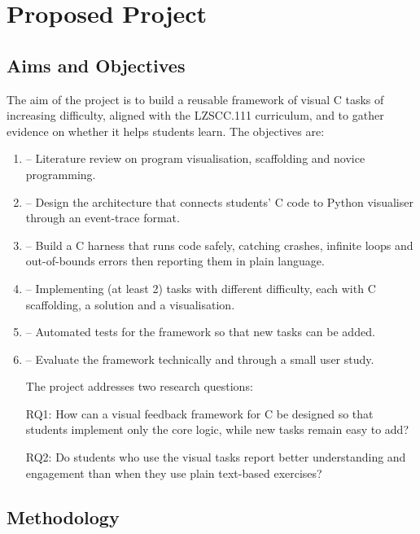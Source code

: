 \documentclass[11pt,a4paper]{article}
\begin{document}
\section{Proposed Project}\label{sec:project}

\subsection{Aims and Objectives}\label{sec:objectives}

The aim of the project is to build a reusable framework of visual C tasks of increasing difficulty,
aligned with the LZSCC.111 curriculum, and to gather evidence on whether it helps students learn. The objectives are:

\begin{enumerate}[label=\textbf{O\arabic*}]
	\item \textbf{} -- Literature review on program visualisation, scaffolding and novice programming. 
	\item \textbf{} -- Design the architecture that connects students' C code to Python visualiser through an event-trace format.
	\item \textbf{} -- Build a C harness that runs code safely, catching crashes, infinite loops and out-of-bounds errors then reporting them in plain language.
    \item \textbf{} -- Implementing (at least 2) tasks with different difficulty, each with C scaffolding, a solution and a visualisation.
    \item \textbf{} -- Automated tests for the framework so that new tasks can be added.
    \item \textbf{} -- Evaluate the framework technically and through a small user study.

    \textit{} The project addresses two research questions:
    
    \textit{} RQ1: How can a visual feedback framework for C be designed so that students implement only the core logic, while new tasks remain easy to add?

    \textit{} RQ2: Do students who use the visual tasks report better understanding and engagement than when they use plain text-based exercises?
    
\end{enumerate}

\subsection{Methodology}\label{sec:methodology}
\end{document}

